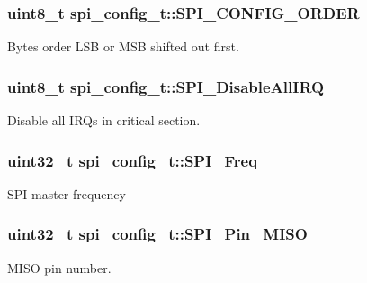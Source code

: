 \subsubsection[{S\+P\+I\+\_\+\+C\+O\+N\+F\+I\+G\+\_\+\+O\+R\+D\+E\+R}]{\setlength{\rightskip}{0pt plus 5cm}uint8\+\_\+t spi\+\_\+config\+\_\+t\+::\+S\+P\+I\+\_\+\+C\+O\+N\+F\+I\+G\+\_\+\+O\+R\+D\+E\+R}\label{structspi__config__t_a6e4ea71d5db65c5eb7cc4e20baeb3f89}
Bytes order L\+S\+B or M\+S\+B shifted out first. \hypertarget{structspi__config__t_a192bd62026822c91500c855ead762930}{}
\subsubsection[{S\+P\+I\+\_\+\+Disable\+All\+I\+R\+Q}]{\setlength{\rightskip}{0pt plus 5cm}uint8\+\_\+t spi\+\_\+config\+\_\+t\+::\+S\+P\+I\+\_\+\+Disable\+All\+I\+R\+Q}\label{structspi__config__t_a192bd62026822c91500c855ead762930}
Disable all I\+R\+Qs in critical section. \hypertarget{structspi__config__t_aa6e0844c0a2a780bc188cab9ffb11e8c}{}
\subsubsection[{S\+P\+I\+\_\+\+Freq}]{\setlength{\rightskip}{0pt plus 5cm}uint32\+\_\+t spi\+\_\+config\+\_\+t\+::\+S\+P\+I\+\_\+\+Freq}\label{structspi__config__t_aa6e0844c0a2a780bc188cab9ffb11e8c}
S\+P\+I master frequency \hypertarget{structspi__config__t_a4ec727e95918e191cb86e097551a1c0e}{}
\subsubsection[{S\+P\+I\+\_\+\+Pin\+\_\+\+M\+I\+S\+O}]{\setlength{\rightskip}{0pt plus 5cm}uint32\+\_\+t spi\+\_\+config\+\_\+t\+::\+S\+P\+I\+\_\+\+Pin\+\_\+\+M\+I\+S\+O}\label{structspi__config__t_a4ec727e95918e191cb86e097551a1c0e}
M\+I\+S\+O pin number. \hypertarget{structspi__config__t_a89ded8ee677dc15a50fef11237137fad}{}
